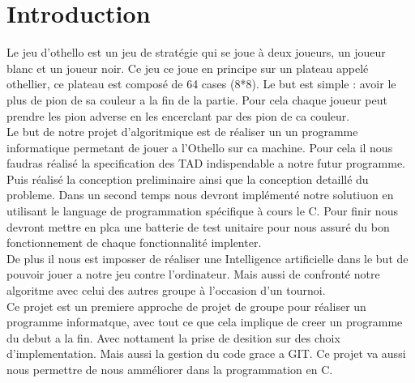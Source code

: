 \section{Introduction}
Le jeu d'othello est un jeu de stratégie qui se joue à deux joueurs, un joueur blanc et un joueur noir. 
Ce jeu ce joue en principe sur un plateau appelé othellier, ce plateau est composé de 64 cases (8*8).
Le but est simple : avoir le plus de pion de sa couleur a la fin de la partie.
Pour cela chaque joueur peut prendre les pion adverse en les encerclant par des pion de ca couleur. 
\\ Le but de notre projet d'algoritmique est de réaliser un  un programme informatique permetant de jouer a l'Othello sur ca machine.
Pour cela il nous faudras réalisé la specification des TAD indispendable a notre futur programme. Puis réalisé la conception preliminaire ainsi que la conception detaillé du probleme.
Dans un second temps nous devront implémenté notre solutiuon en utilisant le language de programmation spécifique à cours le C. 
Pour finir nous devront mettre en plca une batterie de test unitaire pour nous assuré du bon fonctionnement de chaque fonctionnalité implenter.
\\ De plus il nous est imposser de réaliser une Intelligence artificielle dans le but de pouvoir jouer a notre jeu contre l'ordinateur.
Mais aussi de confronté notre algoritme avec celui des autres groupe à l'occasion d'un tournoi.
\\ Ce projet est un premiere approche de projet de groupe pour réaliser un programme informatque, avec tout ce que cela implique de creer un programme du debut a la fin.
Avec nottament la prise de desition sur des choix d'implementation. Mais aussi la gestion du code grace a GIT.  
 Ce projet va  aussi nous permettre  de nous amméliorer dans la programmation en C.
 

